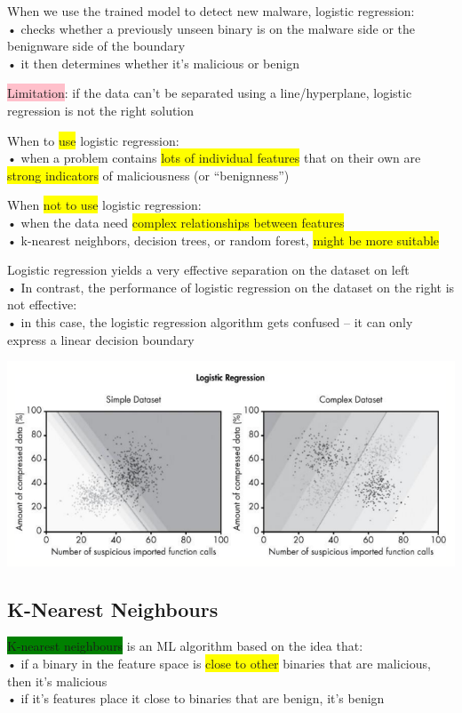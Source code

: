 \documentclass[]{project_plan}
\begin{document}
When we use the trained model to detect new malware, logistic regression:\\
• checks whether a previously unseen binary is on the malware side or the benignware side of the
boundary\\
• it then determines whether it’s malicious or benign

\colorbox{pink}{Limitation}: if the data can’t be separated using a line/hyperplane, logistic regression is not the
right solution

When to \colorbox{yellow}{use} logistic regression:\\
• when a problem contains \colorbox{yellow}{lots of individual features} that on their own are \colorbox{yellow}{strong indicators} of maliciousness
(or “benignness”)

When \colorbox{yellow}{not to use} logistic regression:\\
• when the data need \colorbox{yellow}{complex relationships between features}\\
• k-nearest neighbors, decision trees, or random forest, \colorbox{yellow}{might be more suitable}

\newpage

Logistic regression yields a very effective separation on the dataset on left\\
• In contrast, the performance of logistic regression on the dataset on the right is not effective:\\
• in this case, the logistic regression algorithm gets confused – it can only express a linear decision
boundary

\includegraphics[width=.8\linewidth]{ml63.png}

\subsection{K-Nearest Neighbours}

\colorbox{green}{K-nearest neighbours} is an ML algorithm based on the idea that:\\
• if a binary in the feature space is \colorbox{yellow}{close to other} binaries that are malicious, then it’s
malicious\\
• if it’s features place it close to binaries that are benign, it’s benign
\end{document}
